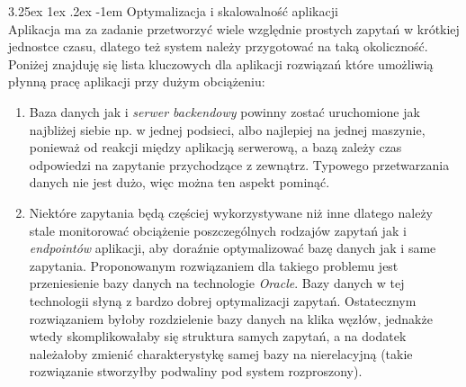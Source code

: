 \documentclass[10pt,titlepage]{article} %
\makeatletter
\renewcommand{\normalsize}{\fontsize{8pt}{10pt}\selectfont} %
\renewcommand\paragraph{\@startsection{paragraph}{5}{\z@}%
  {3.25ex \@plus1ex \@minus.2ex}%
  {-1em}%
  {\normalfont\normalsize\bfseries}}
\makeatother
\begin{document}
\paragraph{Optymalizacja i skalowalność aplikacji}\mbox{}\\
Aplikacja ma za zadanie przetworzyć wiele względnie prostych zapytań w krótkiej jednostce czasu, dlatego też system należy przygotować na taką okoliczność. Poniżej znajduję się lista kluczowych dla aplikacji rozwiązań które umożliwią płynną pracę aplikacji przy dużym obciążeniu:
\begin{enumerate}
\item Baza danych jak i \textit{serwer backendowy} powinny zostać uruchomione jak najbliżej siebie np. w jednej podsieci, albo najlepiej na jednej maszynie, ponieważ od reakcji między aplikacją serwerową, a bazą zależy czas odpowiedzi na zapytanie przychodzące z zewnątrz. Typowego przetwarzania danych nie jest dużo, więc można ten aspekt pominąć.
\item Niektóre zapytania będą częściej wykorzystywane niż inne dlatego należy stale monitorować obciążenie poszczególnych rodzajów zapytań jak i \textit{endpointów} aplikacji, aby doraźnie optymalizować bazę danych jak i same zapytania. Proponowanym rozwiązaniem dla takiego problemu jest przeniesienie bazy danych na technologie \textit{Oracle}. Bazy danych w tej technologii słyną z bardzo dobrej optymalizacji zapytań. Ostatecznym rozwiązaniem byłoby rozdzielenie bazy danych na klika węzłów, jednakże wtedy skomplikowałaby się struktura samych zapytań, a na dodatek należałoby zmienić charakterystykę samej bazy na nierelacyjną (takie rozwiązanie stworzyłby podwaliny pod system rozproszony).
\end{enumerate}

\end{document}
